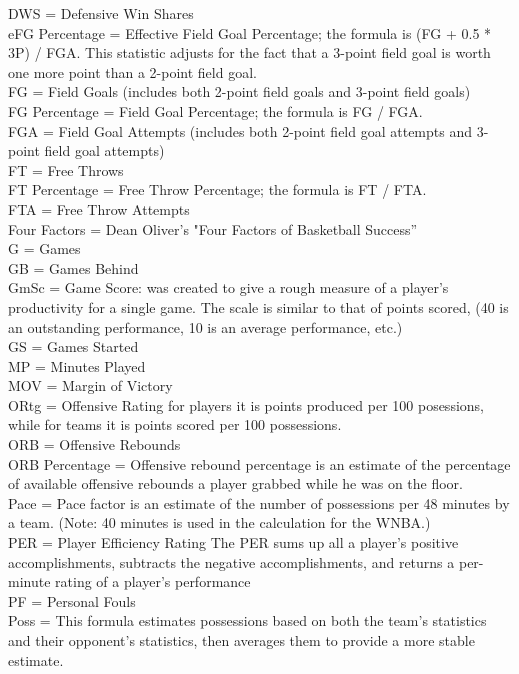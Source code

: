 \documentclass[journal,onecolumn]{IEEEtran}
\begin{document}
DWS = Defensive Win Shares\\
eFG Percentage = Effective Field Goal Percentage; the formula is (FG + 0.5 * 3P) / FGA. This statistic adjusts for the fact that a 3-point field goal is worth one more point than a 2-point field goal. \\
FG = Field Goals (includes both 2-point field goals and 3-point field goals) \\
FG Percentage = Field Goal Percentage; the formula is FG / FGA.\\
FGA = Field Goal Attempts (includes both 2-point field goal attempts and 3-point field goal attempts)\\
FT = Free Throws\\
FT Percentage = Free Throw Percentage; the formula is FT / FTA.\\
FTA = Free Throw Attempts\\
Four Factors = Dean Oliver's "Four Factors of Basketball Success”\\
G = Games\\
GB = Games Behind\\
GmSc = Game Score: was created to give a rough measure of a player's productivity for a single game. The scale is similar to that of points scored, (40 is an outstanding performance, 10 is an average performance, etc.)\\
GS = Games Started \\
MP = Minutes Played \\
MOV = Margin of Victory\\
ORtg = Offensive Rating for players it is points produced per 100 posessions, while for teams it is points scored per 100 possessions. \\
ORB = Offensive Rebounds\\
ORB Percentage = Offensive rebound percentage is an estimate of the percentage of available offensive rebounds a player grabbed while he was on the floor.\\
Pace = Pace factor is an estimate of the number of possessions per 48 minutes by a team. (Note: 40 minutes is used in the calculation for the WNBA.)\\
PER = Player Efficiency Rating The PER sums up all a player's positive accomplishments, subtracts the negative accomplishments, and returns a per-minute rating of a player's performance\\
PF = Personal Fouls\\
Poss = This formula estimates possessions based on both the team's statistics and their opponent's statistics, then averages them to provide a more stable estimate. \\
\end{document}
